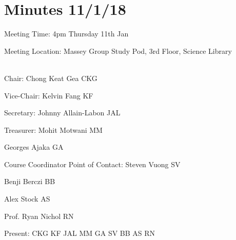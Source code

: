 \noindent 
\section{Minutes 11/1/18}\label{app:11-1}

\noindent Meeting Time: 4pm Thursday 11th Jan

\noindent Meeting Location: Massey Group Study Pod, 3rd Floor, Science Library
\\\\
\noindent \textbf{}

\noindent Chair: Chong Keat Gea CKG

\noindent Vice-Chair: Kelvin Fang KF

\noindent Secretary: Johnny Allain-Labon JAL

\noindent Treasurer: Mohit Motwani MM

\noindent Georges Ajaka GA

\noindent Course Coordinator Point of Contact: Steven Vuong SV

\noindent Benji Berczi BB

\noindent Alex Stock AS

\noindent Prof. Ryan Nichol RN

\noindent 

\noindent Present: CKG KF JAL MM GA SV BB AS RN


